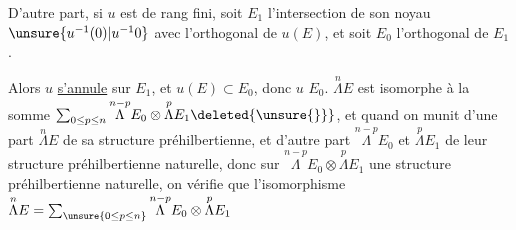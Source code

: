 D'autre part, si $u$ est de rang fini,   soit $E_{1}$ l'intersection de son noyau $\unsure{u^{-1}(0)|u^{-1}0}$ avec l'orthogonal de  $u(E)$, et soit $E_0$ l'orthogonal de $E_1$.

Alors $u$ \uline{s'annule} sur $E_1$, et $u(E)\subset E_0$, donc $u$ \uline{} $E_0$. $\overset{n}{\Lambda}E$ est   isomorphe à la somme $\sum_{0\leq p\leq n}\overset{n-p}{\Lambda}E_0\otimes\overset{p}{\Lambda}E_1\deleted{\unsure{\}}}$, et quand on munit d'une  part $\overset{n}{\Lambda}E$ de sa structure préhilbertienne, et d'autre part $\overset{n-p}{\Lambda}E_0$ et $\overset{p}{\Lambda}E_1$ de leur structure préhilbertienne naturelle, donc sur $\overset{n-p}{\Lambda}E_0\otimes\overset{p}{\Lambda}E_1$ une structure préhilbertienne naturelle, on vérifie que l'isomorphisme $\overset{n}{\Lambda}E=\sum_{\unsure{0\leq p\leq n}}\overset{n-p}{\Lambda}E_0\otimes\overset{p}{\Lambda}E_1$
